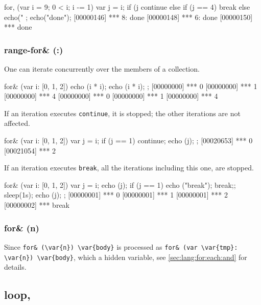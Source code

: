 \begin{urbiscript}
for, (var i = 9; 0 < i; i -= 1)
{
  var j = i;
  if (j %
    continue
  else if (j == 4)
    break
  else
    echo("%
};
echo("done");
[00000146] *** 8: done
[00000148] *** 6: done
[00000150] *** done
\end{urbiscript}


\subsubsection{range-for\& (:)}
\label{sec:lang:for:each:and}

One can iterate concurrently over the members of a collection.

\begin{urbiscript}
for& (var i: [0, 1, 2])
{
  echo (i * i);
  echo (i * i);
};
[00000000] *** 0
[00000000] *** 1
[00000000] *** 4
[00000000] *** 0
[00000000] *** 1
[00000000] *** 4
\end{urbiscript}

If an iteration executes \lstinline|continue|, it is stopped; the
other iterations are not affected.

\begin{urbiscript}
for& (var i: [0, 1, 2])
{
  var j = i;
  if (j == 1)
    continue;
  echo (j);
};
[00020653] *** 0
[00021054] *** 2
\end{urbiscript}

If an iteration executes \lstinline|break|, all the iterations
including this one, are stopped.

\begin{urbiscript}
for& (var i: [0, 1, 2])
{
  var j = i;
  echo (j);
  if (j == 1)
   { echo ("break");
    break;};
  sleep(1s);
  echo (j);
};
[00000001] *** 0
[00000001] *** 1
[00000001] *** 2
[00000002] *** break
\end{urbiscript}

\subsubsection{for\& (n)}

Since \lstinline|for& (\var{n}) \var{body}| is processed as
\lstinline|for& (var \var{tmp}: \var{n}) \var{body}|, which 
a hidden variable, see \autoref{sec:lang:for:each:and} for details.


\subsection{loop,}
\experimentalremoved{}

